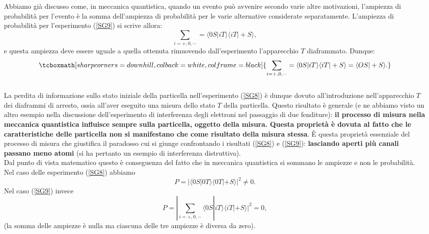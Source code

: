 \documentclass[a4paper,12pt,oneside]{book}
\begin{document}
Abbiamo già discusso come, in meccanica quantistica, quando un evento può avvenire secondo varie altre motivazioni, l'ampiezza di probabilità per l'evento è la somma dell'ampiezza di probabilità per le varie alternative considerate separatamente. L'ampiezza di probabilità per l'esperimento (\ref{SG9}) si scrive allora:
	\begin{equation}
		\sum\limits_{i=+,0,-}=\langle 0S | iT \rangle \langle iT | +S \rangle ,
	\end{equation}
e questa ampiezza deve essere uguale a quella ottenuta rimuovendo  dall'esperimento l'apparecchio $T$ diaframmato. Dunque:
	\begin{equation}
		\tcboxmath[sharp corners=downhill, colback=white, colframe=black]{
			\sum\limits_{i=+,0,-}=\langle 0S | iT \rangle \langle iT | +S \rangle = \langle OS | +S \rangle .
			}
 	\label{cap3_2}
	\end{equation}\\

La perdita di informazione sullo stato iniziale della particella nell'esperimento (\ref{SG8}) è dunque dovuto all'introduzione nell'apparecchio $T$ dei diaframmi di arresto, ossia all'aver eseguito una misura dello stato $T$ della particella. Questo risultato è generale (e ne abbiamo visto un altro esempio nella discussione dell'esperimento di interferenza degli elettroni nel passaggio di due fenditure): \textbf{il processo di misura nella meccanica quantistica influisce sempre sulla particella, oggetto della misura. Questa proprietà è dovuta al fatto che le caratteristiche delle particella non si manifestano che come risultato della misura stessa}. È questa proprietà essenziale del processo di misura che giustifica il paradosso cui si giunge confrontando i risultati (\ref{SG8}) e (\ref{SG9}): \textbf{lasciando aperti più canali passano meno atomi} (si ha pertanto un esempio di interferenza distruttiva).\\

Dal punto di vista matematico questo è conseguenza del fatto che in meccanica quantistica si sommano le ampiezze e non le probabilità. Nel caso delle esperimento (\ref{SG8}) abbiamo
	\begin{equation}
		P= | \langle 0S | 0T \rangle \langle 0T | +S \rangle  |^2 \neq 0 .
	\end{equation}
Nel caso (\ref{SG9}) invece
	\begin{equation}
		P= |\sum \limits_{i=+,0,-}\langle 0S | iT \rangle \langle iT | +S \rangle |^2 =0 ,
	\end{equation}
(la somma delle ampiezze è nulla ma ciascuna delle tre ampiezze è diversa da zero).\\
\end{document}
